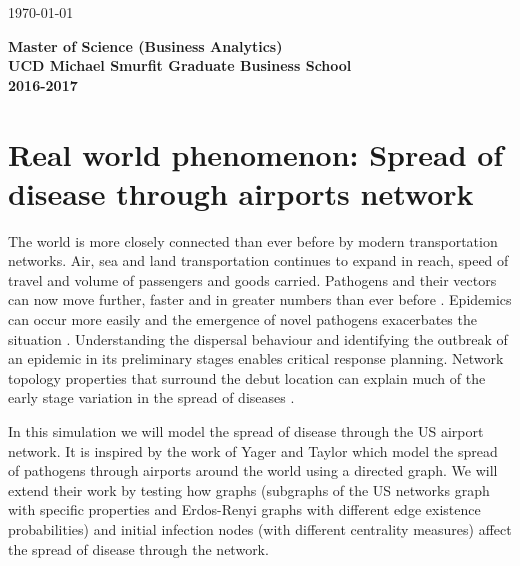 \documentclass[a4paper,11pt]{article}
\begin{document}
\begin{titlepage}
{\large \today}\\[3cm] %


 

{

	 \vspace{1.5in}\textmd{\textbf{Master of Science (Business Analytics)}}\\
     \large{\textbf{UCD Michael Smurfit Graduate Business School }}\\
      \textmd{\textbf{2016-2017}}\\
 }     
\vfill %

\end{titlepage}





\section{Real world phenomenon: Spread of disease through airports network} 


The world is more closely connected than ever before by modern transportation networks. Air, sea and land transportation continues to expand in reach, speed of travel and volume of passengers and goods carried. Pathogens and their vectors can now move further, faster and in greater numbers than ever before \cite{tatem2006global}. Epidemics can occur more easily and the emergence of novel pathogens exacerbates the situation \cite{jones2008global}. Understanding the dispersal behaviour and identifying the outbreak of an epidemic in its preliminary stages enables critical response planning. Network topology properties that surround the debut location can explain much of the early stage variation in the spread of diseases \cite{lawyer2016measuring}.

In this simulation we will model the spread of disease through the US airport network. It is inspired by the work of Yager and Taylor \cite{nicholasyager2014} which model the spread of pathogens through airports around the world using a directed graph. We will extend their work by testing how graphs (subgraphs of the US networks graph with specific properties and Erdos-Renyi graphs with different edge existence probabilities) and initial infection nodes (with different centrality measures) affect the spread of disease through the network.
\end{document}
